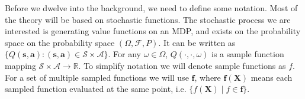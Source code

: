 \documentclass[]{uai2022} %
\newcommand{\defeq}{\vcentcolon=}
\newcommand{\E}{\mathbb{E}}
\newcommand{\D}{\mathcal{D}}
\newcommand{\B}{\mathcal{B}}
\newcommand{\X}{\mathbf{X}}
\newcommand{\f}{\mathbf{f}}
\newcommand{\state}{\mathcal{S}}
\newcommand{\action}{\mathcal{A}}
\begin{document}
Before we dwelve into the background, we need to define some notation. Most of the
theory will be based on stochastic functions. The stochastic process we are interested is
generating value functions on an MDP, and exists on the probability space on the probability
space \((\Omega, \mathcal{F}, P)\). It can be written as
\(\{Q(\bm{s}, \bm{a}) : (\bm{s}, \bm{a}) \in \state \times \action \}\). For
any \(\omega \in \Omega\), \(Q(\cdot, \cdot, \omega)\) is a sample function
mapping \(\state \times \action \rightarrow \mathbb{R}\). To simplify notation
we will denote sample functions as \(f\). For a set of multiple sampled functions we will
use \(\f\), where \(\f(\X)\) means each sampled function evaluated at the same point,
i.e. \(\{f(\X) \mid f \in \f\}\). 


\end{document}
